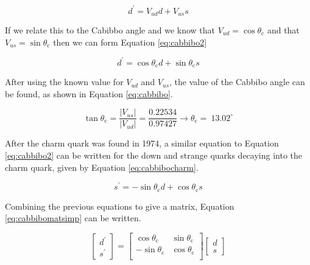 \documentclass[11pt,oneside,a4paper]{article}
\begin{document}
\begin{equation}
\label{eq:cabbibods}
d^{\prime }=V_{ud}d+V_{us}s
\end{equation}

If we relate this to the Cabibbo angle and we know that $V_{ud}=\cos \theta _{\mathrm {c}}$ and that $V_{us}=\sin \theta _{\mathrm {c}}$ then we can form Equation \ref{eq:cabbibo2}

\begin{equation}
\label{eq:cabbibo2}
d^{\prime }=\cos \theta _{\mathrm {c} }d+\sin \theta _{\mathrm {c} }s
\end{equation}

After using the known value for $V_{ud}$ and $V_{us}$, the value of the Cabbibo angle can be found, as shown in Equation \ref{eq:cabbibo}.

\begin{equation}
\label{eq:cabbibo}
\tan \theta _{\mathrm {c} }={\frac {|V_{us}|}{|V_{ud}|}}={\frac {0.22534}{0.97427}}\rightarrow \theta _{\mathrm {c} }=~13.02^{\circ }
\end{equation}

After the charm quark was found in 1974, a similar equation to Equation \ref{eq:cabbibo2} can be written for the down and strange quarks decaying into the charm quark, given by Equation \ref{eq:cabbibocharm}.

\begin{equation}
\label{eq:cabbibocharm}
s^{\prime }=-\sin {\theta _{\mathrm {c} }}d+\cos {\theta _{\mathrm {c} }}s
\end{equation}

Combining the previous equations to give a matrix, Equation \ref{eq:cabbibomatsimp} can be written.

\begin{equation}
\label{eq:cabbibomatsimp}
{\begin{bmatrix}d^{\prime }\\s^{\prime }\end{bmatrix}}={\begin{bmatrix}\cos {\theta _{\mathrm {c} }}&\sin {\theta _{\mathrm {c} }}\\-\sin {\theta _{\mathrm {c} }}&\cos {\theta _{\mathrm {c} }}\\\end{bmatrix}}{\begin{bmatrix}d\\s\end{bmatrix}}
\end{equation}
\end{document}
